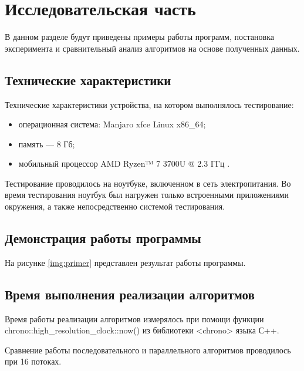 \chapter{Исследовательская часть}

В данном разделе будут приведены примеры работы программ, постановка эксперимента и сравнительный анализ алгоритмов на основе полученных данных.

\section{Технические характеристики}

Технические характеристики устройства, на котором выполнялось тестирование:

\begin{itemize}
	\item операционная система: Manjaro xfce \cite{ubuntu} Linux \cite{linux} x86\_64;
	\item память --- 8 Гб;
	\item мобильный процессор AMD Ryzen™ 7 3700U @ 2.3 ГГц \cite{intel}.
\end{itemize}

Тестирование проводилось на ноутбуке, включенном в сеть электропитания. Во время тестирования ноутбук был нагружен только встроенными приложениями окружения, а также непосредственно системой тестирования.

\section{Демонстрация работы программы}

На рисунке \ref{img:primer} представлен результат работы программы.

\FloatBarrier

\section{Время выполнения реализации алгоритмов}

Время работы реализации алгоритмов измерялось при помощи функции chrono::high\_resolution\_clock::now() из библиотеки <chrono> языка С++.

Сравнение работы последовательного и параллельного алгоритмов проводилось при 16 потоках.

